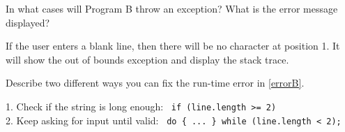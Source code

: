 %


\Q \label{errorB}
In what cases will Program B throw an exception? What is the error message displayed?

\begin{answer}
If the user enters a blank line, then there will be no character at position 1. It will show the out of bounds exception and display the stack trace.
\end{answer}


\Q Describe two different ways you can fix the run-time error in \ref{errorB}.

\begin{answer}[3em]
1. Check if the string is long enough: ~{\tt if (line.length >= 2)} \\
2. Keep asking for input until valid: ~{\tt do \{~...~\} while (line.length < 2);}
\end{answer}
